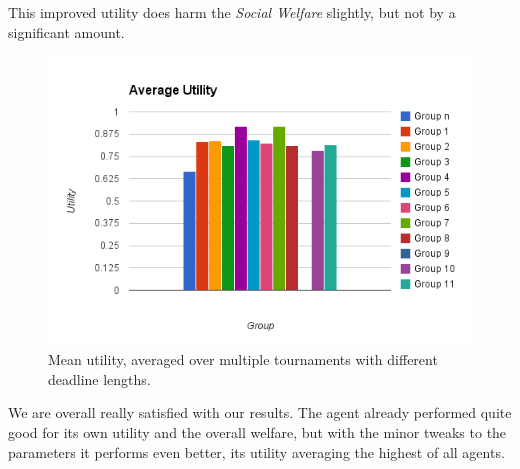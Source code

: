 \documentclass[a4,11pt]{scrartcl}
\begin{document}
This improved utility does harm the \emph{Social Welfare} slightly, but not by a significant amount.

\begin{figure}[ht]
    \centering
    \includegraphics[width=\textwidth]{image.png}
    \caption{Mean utility, averaged over multiple tournaments with different deadline lengths.}
    \label{fig:utility}
\end{figure}


We are overall really satisfied with our results. The agent already performed quite good for its own utility and the overall welfare, but with the minor tweaks to the parameters it performs even better, its utility averaging the highest of all agents.
\label{sec:finalresults}
\end{document}
